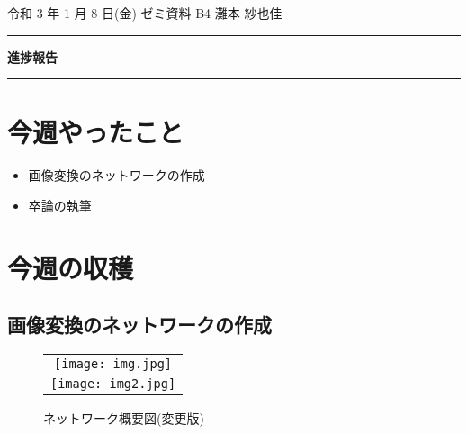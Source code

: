 \documentclass[onecolumn]{jarticle}     %
\begin{document}


\noindent

\hspace{1em}
令和 3 年 1 月 8 日(金)
ゼミ資料
\hfill
B4 灘本 紗也佳

\vspace{2mm}

\hrule

\begin{center}
{\Large \bf 進捗報告}
\end{center}


\hrule
\vspace{3mm}

\section{今週やったこと}
	\begin{itemize}
	  \item 画像変換のネットワークの作成
       \vspace{-0.5em}
 	  \item 卒論の執筆
	\end{itemize}

\section{今週の収穫}
\subsection{画像変換のネットワークの作成}
\begin{figure}[h]
    \centering
    \begin{tabular}{c}
        \begin{minipage}{0.9\hsize}
            \centering
            \texttt{[image: img.jpg]}
	       \caption{ネットワーク概要図}
	       \label{data_generator}
        \end{minipage}\\

\vspace{1zh}				

        \begin{minipage}{0.9\hsize}
            \centering
            \texttt{[image: img2.jpg]}
	        \caption{ネットワーク概要図(変更版)}
	        \label{data_generator2}
        \end{minipage}
    \end{tabular}
\end{figure}
\end{document}
